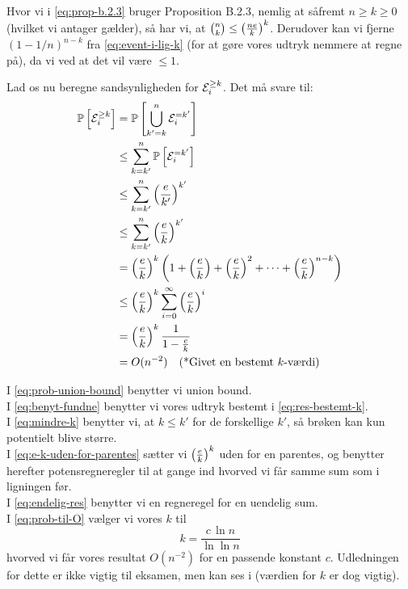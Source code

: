 Hvor vi i \cref{eq:prop-b.2.3} bruger Proposition B.2.3, nemlig at såfremt $n \geq k \geq 0$ (hvilket vi antager gælder), så har vi, at $\binom{n}{k} \leq \left( \frac{ne}{k} \right)^k$. Derudover kan vi fjerne $(1 - 1/n)^{n-k}$ fra \cref{eq:event-i-lig-k} (for at gøre vores udtryk nemmere at regne på), da vi ved at det vil være $\leq 1$.


Lad os nu beregne sandsynligheden for ${\mathcal{E}}_i^{\geq k}$. Det må svare til:
\begin{align}
  \mathbb{P} \left[   {\mathcal{E}}_i^{\geq k}   \right]
  &= \mathbb{P} \left[   \bigcup_{k' = k}^n {\mathcal{E}}_i^{=k'}   \right] \nonumber \\
  &\leq \sum_{k=k'}^n \mathbb{P} \left[   {\mathcal{E}}_i^{=k'}   \right] \label{eq:prob-union-bound} \\
  &\leq \sum_{k=k'}^n \left( \frac{e}{k'} \right)^{k'} \label{eq:benyt-fundne} \\
  &\leq \sum_{k=k'}^n \left( \frac{e}{k} \right)^{k'} \label{eq:mindre-k} \\
  &= \left( \frac{e}{k} \right)^k \left(  1 + \left( \frac{e}{k} \right) + \left( \frac{e}{k} \right)^2 + \cdots + \left( \frac{e}{k} \right)^{n-k}  \right) \label{eq:e-k-uden-for-parentes} \\
  &\leq \left( \frac{e}{k} \right)^k \sum_{i = 0}^\infty \left( \frac{e}{k} \right)^i \nonumber \\
  &= \left( \frac{e}{k} \right)^k \frac{1}{1 - \frac{e}{k}} \label{eq:endelig-res}\\
  &= O(n^{-2}) \quad \text{(*Givet en bestemt $k$-værdi)} \label{eq:prob-til-O}
\end{align}

I \cref{eq:prob-union-bound} benytter vi union bound.\\
I \cref{eq:benyt-fundne} benytter vi vores udtryk bestemt i \cref{eq:res-bestemt-k}.\\
I \cref{eq:mindre-k} benytter vi, at $k \leq k'$ for de forskellige $k'$, så brøken kan kun potentielt blive større.\\
I \cref{eq:e-k-uden-for-parentes} sætter vi $\left( \frac{e}{k} \right)^k$ uden for en parentes, og benytter herefter potensregneregler til at gange ind hvorved vi får samme sum som i ligningen før.\\
I \cref{eq:endelig-res} benytter vi en regneregel for en uendelig sum.\\
I \cref{eq:prob-til-O} vælger vi vores $k$ til
$$
k = \frac{c \, \ln n}{\ln \ln n}
$$
hvorved vi får vores resultat $O(n^{-2})$ for en passende konstant $c$. Udledningen for dette er ikke vigtig til eksamen, men kan ses i  (værdien for $k$ er dog vigtig).\\\\


